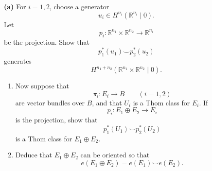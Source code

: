 \begin{problem}
\noindent\textbf{(a)} For \(i=1,2\), choose a generator
\[
u_i\in H^{n_i}(\mathbb R^{n_i}\mid 0).
\]
Let
\[
p_i:\mathbb R^{n_1}\times \mathbb R^{n_2}\longrightarrow \mathbb R^{n_i}
\]
be the projection. Show that
\[
p_1^*(u_1)\smile p_2^*(u_2)
\]
generates
\[
H^{n_1+n_2}(\mathbb R^{n_1}\times \mathbb R^{n_2}\mid 0).
\]

\begin{enumerate}
	\item[(b)] Now suppose that
	\[
	\pi_i:E_i\to B
	\qquad (i=1,2)
	\]
	are vector bundles over \(B\), and that \(U_i\) is a Thom class for \(E_i\).
	If
	\[
	p_i:E_1\oplus E_2\to E_i
	\]
	is the projection, show that
	\[
	p_1^*(U_1)\smile p_2^*(U_2)
	\]
	is a Thom class for \(E_1\oplus E_2\).

	\item[(c)] Deduce that \(E_1\oplus E_2\) can be oriented so that
	\[
	e(E_1\oplus E_2)=e(E_1)\smile e(E_2).
	\]
\end{enumerate}

\par

\noindent
\end{problem}

